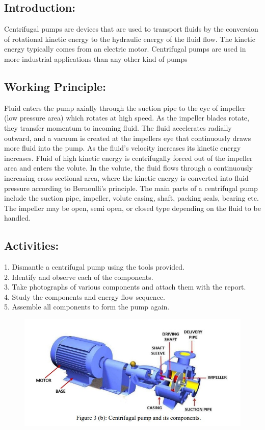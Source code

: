 \documentclass[12pt]{article}
\begin{document}
\subsection*{Introduction:}
Centrifugal pumps are devices that are used to transport fluids by the conversion of rotational kinetic energy to the hydraulic energy of the fluid flow. The kinetic energy typically comes 
from an electric motor. Centrifugal pumps are used in more industrial applications than any other kind of pumps

\subsection*{Working Principle:}
Fluid enters the pump axially through the suction pipe to the eye of impeller (low pressure area) which rotates at high speed. As the impeller blades rotate, they transfer momentum to incoming fluid. The fluid accelerates radially outward, and a vacuum is created at the impellers eye that continuously draws more fluid into the pump. As the fluid's velocity increases its kinetic energy increases. Fluid of high kinetic energy is centrifugally forced out of the impeller area and enters the volute. In the volute, the fluid flows through a continuously increasing cross sectional area, where the kinetic energy is converted into fluid pressure according to Bernoulli's principle. The main parts of a centrifugal pump include the suction pipe, impeller, volute casing, shaft, packing seals, bearing etc. The impeller may be open, semi open, or closed 
type depending on the fluid to be handled. 


\subsection*{Activities:}
1. Dismantle a centrifugal pump using the tools provided. \\
2. Identify and observe each of the components. \\
3. Take photographs of various components and attach them with the report. \\
4. Study the components and energy flow sequence. \\
5. Assemble all components to form the pump again. \\

\begin{figure}[H]
  \begin{center}
    \includegraphics*[width=0.9\linewidth]{img/cetrifugal_pump.jpeg}
  \end{center}
\end{figure}
\end{document}
